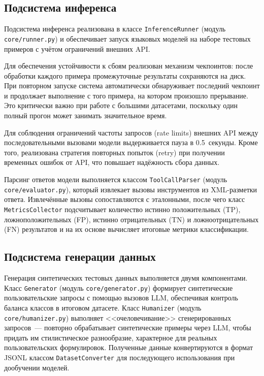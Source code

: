 \subsection{Подсистема инференса}

Подсистема инференса реализована в классе \texttt{InferenceRunner} (модуль \texttt{core/runner.py}) и обеспечивает запуск языковых моделей на наборе тестовых примеров с учётом ограничений внешних API.

Для обеспечения устойчивости к сбоям реализован механизм чекпоинтов: после обработки каждого примера промежуточные результаты сохраняются на диск. При повторном запуске система автоматически обнаруживает последний чекпоинт и продолжает выполнение с того примера, на котором произошло прерывание. Это критически важно при работе с большими датасетами, поскольку один полный прогон может занимать значительное время.

Для соблюдения ограничений частоты запросов (rate limits) внешних API между последовательными вызовами модели выдерживается пауза в 0.5~секунды. Кроме того, реализована стратегия повторных попыток (retry) при получении временных ошибок от API, что повышает надёжность сбора данных.

Парсинг ответов модели выполняется классом \texttt{ToolCallParser} (модуль \texttt{core/evaluator.py}), который извлекает вызовы инструментов из XML-разметки ответа. Извлечённые вызовы сопоставляются с эталонными, после чего класс \texttt{MetricsCollector} подсчитывает количество истинно положительных (TP), ложноположительных (FP), истинно отрицательных (TN) и ложноотрицательных (FN) результатов и на их основе вычисляет итоговые метрики классификации.

\subsection{Подсистема генерации данных}

Генерация синтетических тестовых данных выполняется двумя компонентами. Класс \texttt{Generator} (модуль \texttt{core/generator.py}) формирует синтетические пользовательские запросы с помощью вызовов LLM, обеспечивая контроль баланса классов в итоговом датасете. Класс \texttt{Humanizer} (модуль \texttt{core/humanizer.py}) выполняет <<очеловечивание>> сгенерированных запросов~--- повторно обрабатывает синтетические примеры через LLM, чтобы придать им стилистическое разнообразие, характерное для реальных пользовательских формулировок. Полученные данные конвертируются в формат JSONL классом \texttt{DatasetConverter} для последующего использования при дообучении моделей.

